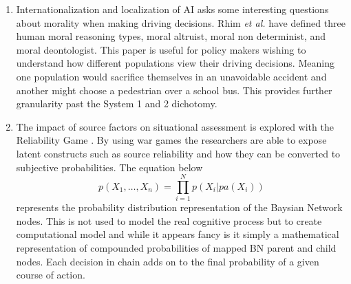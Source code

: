 \documentclass[journal]{IEEEtran}
\begin{document}
\begin{enumerate}
    \item Internationalization and localization of AI asks some interesting questions about morality when making driving decisions. Rhim \textit{et al.} have defined three human moral reasoning types, moral altruist, moral non determinist, and moral deontologist. This paper is useful for policy makers wishing to understand how different populations view their driving decisions. Meaning one population would sacrifice themselves in an unavoidable accident and another might choose a pedestrian over a school bus. This provides further granularity past the System 1 and 2 dichotomy.
    \item The impact of source factors on situational assessment is explored with the Reliability Game \cite{de_rosa_analytical_2019}. By using war games the researchers are able to expose latent constructs such as source reliability and how they can be converted to subjective probabilities. The equation below 
    \begin{equation}
    p(X_1,\ldots,X_n) = \prod_{i=1}^{N} p(X_i|pa(X_i))
    \end{equation}
    represents the probability distribution representation of the Baysian Network nodes. This is not used to model the real cognitive process but to create computational model and while it appears fancy is it simply a mathematical representation of compounded probabilities of mapped BN parent and child nodes. Each decision in chain adds on to the final probability of a given course of action.
\end{enumerate}
\nocite{AIPanel} \nocite{WeedenCan} \nocite{GAO} \nocite{WeedenSpace} \nocite{Rigas} \nocite{Fidler} \nocite{Stephens} \nocite{Frierson} \nocite{Astorino} \nocite{Colby} \nocite{OSTNSS} \nocite{Saran} \nocite{Cleveland} \nocite{acrecampaign} \nocite{klarin_decade-long_2020} \nocite{porayska-pomsta_blending_2018} \nocite{gheondea-eladi_patient_2019} \nocite{zhang_detecting_2019} \nocite{she_qos-aware_2019}  \nocite{rhim_human_2020} \nocite{linkevicius_linking_2019} \nocite{tanaka_disease_2018} \nocite{shahid_applications_2019}



\end{document}
